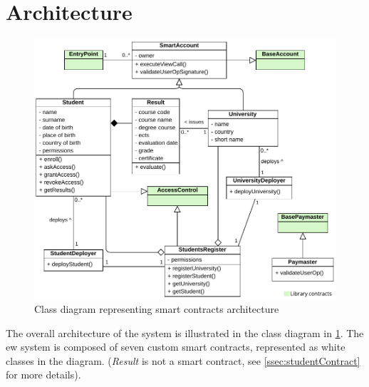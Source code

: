 \section{Architecture}
\begin{figure}
  \centering
  \includegraphics[width=1\textwidth]{figures/Contracts class diagram.pdf}
  \caption[Smart contracts architecture class diagram]{Class diagram representing smart contracts architecture}
  \label{fig:contractsClass}
\end{figure}

The overall architecture of the system is illustrated in the class diagram in \cref{fig:contractsClass}. The \acrshort{ew} system is composed of seven custom smart contracts, represented as white classes in the diagram. (\textit{Result} is not a smart contract, see \cref{ssec:studentContract} for more details). 


